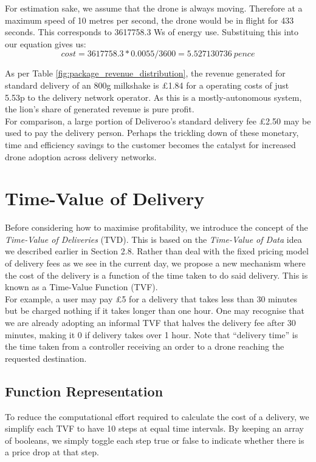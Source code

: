 \documentclass[a4paper,11pt,titlepage]{report}
\begin{document}
For estimation sake, we assume that the drone is always moving. Therefore at a maximum speed of 10 metres per second, the drone would be in flight for 433 seconds. This corresponds to 3617758.3 Ws of energy use. Substituing this into our equation gives us:
$$ cost = 3617758.3 * 0.0055 / 3600 = 5.527130736\ pence $$

As per Table \ref{fig:package_revenue_distribution}, the revenue generated for standard delivery of an 800g milkshake is £1.84 for a operating costs of just 5.53p to the delivery network operator. As this is a mostly-autonomous system, the lion's share of generated revenue is pure profit.\\

For comparison, a large portion of Deliveroo's standard delivery fee £2.50 may be used to pay the delivery person. Perhaps the trickling down of these monetary, time and efficiency savings to the customer becomes the catalyst for increased drone adoption across delivery networks.

\newpage
\chapter{Time-Value of Delivery}
Before considering how to maximise profitability, we introduce the concept of the \textit{Time-Value of Deliveries} (TVD). This is based on the \textit{Time-Value of Data} idea we described earlier in Section 2.8. Rather than deal with the fixed pricing model of delivery fees as we see in the current day, we propose a new mechanism where the cost of the delivery is a function of the time taken to do said delivery. This is known as a Time-Value Function (TVF).\\

For example, a user may pay £5 for a delivery that takes less than 30 minutes but be charged nothing if it takes longer than one hour. One may recognise that we are already adopting an informal TVF that halves the delivery fee after 30 minutes, making it 0 if delivery takes over  1 hour. Note that ``delivery time'' is the time taken from a controller receiving an order to a drone reaching the requested destination.

\section{Function Representation}
To reduce the computational effort required to calculate the cost of a delivery, we simplify each TVF to have 10 steps at equal time intervals. By keeping an array of booleans, we simply toggle each step true or false to indicate whether there is a price drop at that step.\\
\end{document}
